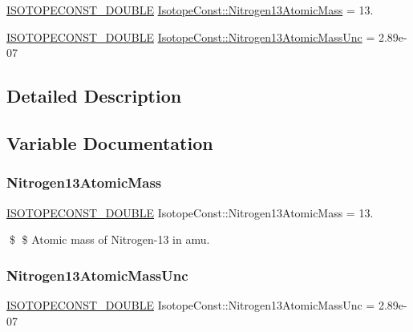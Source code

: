 \begin{DoxyCompactItemize}
\item 
\mbox{\hyperlink{group___isotope_const-_macros_ga8f45a7272ce02c0b4c65c44636ed719a}{I\+S\+O\+T\+O\+P\+E\+C\+O\+N\+S\+T\+\_\+\+D\+O\+U\+B\+LE}} \mbox{\hyperlink{group___isotope_const-_nitrogen-_n13_ga3265a022cf35e8a8d8723d98c60e51c7}{Isotope\+Const\+::\+Nitrogen13\+Atomic\+Mass}} = 13.
\item 
\mbox{\hyperlink{group___isotope_const-_macros_ga8f45a7272ce02c0b4c65c44636ed719a}{I\+S\+O\+T\+O\+P\+E\+C\+O\+N\+S\+T\+\_\+\+D\+O\+U\+B\+LE}} \mbox{\hyperlink{group___isotope_const-_nitrogen-_n13_gae84c193fedfbbda7d899624df8e83c08}{Isotope\+Const\+::\+Nitrogen13\+Atomic\+Mass\+Unc}} = 2.\+89e-\/07
\end{DoxyCompactItemize}


\subsection{Detailed Description}


\subsection{Variable Documentation}
\mbox{\label{group___isotope_const-_nitrogen-_n13_ga3265a022cf35e8a8d8723d98c60e51c7}} 
\subsubsection{\texorpdfstring{Nitrogen13\+Atomic\+Mass}{Nitrogen13AtomicMass}}
{\footnotesize\ttfamily \mbox{\hyperlink{group___isotope_const-_macros_ga8f45a7272ce02c0b4c65c44636ed719a}{I\+S\+O\+T\+O\+P\+E\+C\+O\+N\+S\+T\+\_\+\+D\+O\+U\+B\+LE}} Isotope\+Const\+::\+Nitrogen13\+Atomic\+Mass = 13.}

\$ \$ Atomic mass of Nitrogen-\/13 in amu. \mbox{\label{group___isotope_const-_nitrogen-_n13_gae84c193fedfbbda7d899624df8e83c08}} 
\subsubsection{\texorpdfstring{Nitrogen13\+Atomic\+Mass\+Unc}{Nitrogen13AtomicMassUnc}}
{\footnotesize\ttfamily \mbox{\hyperlink{group___isotope_const-_macros_ga8f45a7272ce02c0b4c65c44636ed719a}{I\+S\+O\+T\+O\+P\+E\+C\+O\+N\+S\+T\+\_\+\+D\+O\+U\+B\+LE}} Isotope\+Const\+::\+Nitrogen13\+Atomic\+Mass\+Unc = 2.\+89e-\/07}

